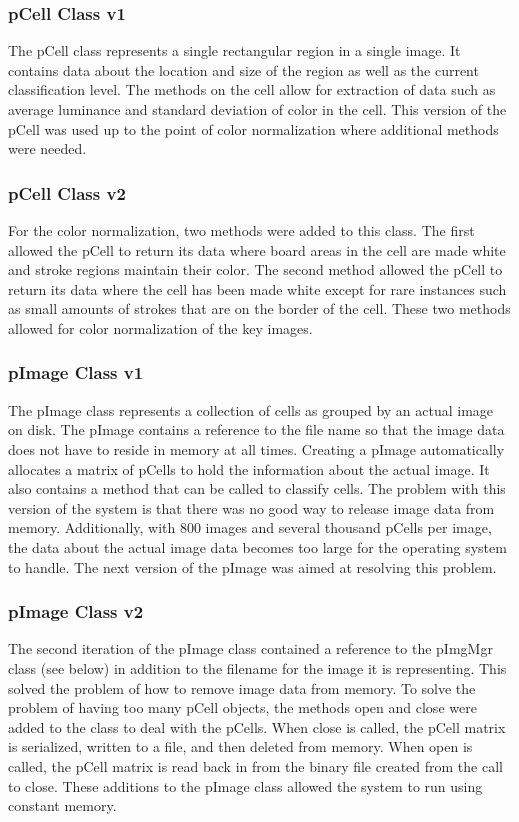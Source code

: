 \documentclass[]{article}
\begin{document}
			\subsubsection{pCell Class v1}
				The pCell class represents a single rectangular region in a single image. It contains data about the location and size of the region as well as the current classification level. The methods on the cell allow for extraction of data such as average luminance and standard deviation of color in the cell. This version of the pCell was used up to the point of color normalization where additional methods were needed.
				
			\subsubsection{pCell Class v2}
				For the color normalization, two methods were added to this class. The first allowed the pCell to return its data where board areas in the cell are made white and stroke regions maintain their color. The second method allowed the pCell to return its data where the cell has been made white except for rare instances such as small amounts of strokes that are on the border of the cell. These two methods allowed for color normalization of the key images.
				
			\subsubsection{pImage Class v1}
				The pImage class represents a collection of cells as grouped by an actual image on disk. The pImage contains a reference to the file name so that the image data does not have to reside in memory at all times. Creating a pImage automatically allocates a matrix of pCells to hold the information about the actual image. It also contains a method that can be called to classify cells. The problem with this version of the system is that there was no good way to release image data from memory. Additionally, with 800 images and several thousand pCells per image, the data about the actual image data becomes too large for the operating system to handle. The next version of the pImage was aimed at resolving this problem.
			
			\subsubsection{pImage Class v2}
				The second iteration of the pImage class contained a reference to the pImgMgr class (see below) in addition to the filename for the image it is representing. This solved the problem of how to remove image data from memory. To solve the problem of having too many pCell objects, the methods open and close were added to the class to deal with the pCells. When close is called, the pCell matrix is serialized, written to a file, and then deleted from memory. When open is called, the pCell matrix is read back in from the binary file created from the call to close. These additions to the pImage class allowed the system to run using constant memory. 
			
\end{document}

